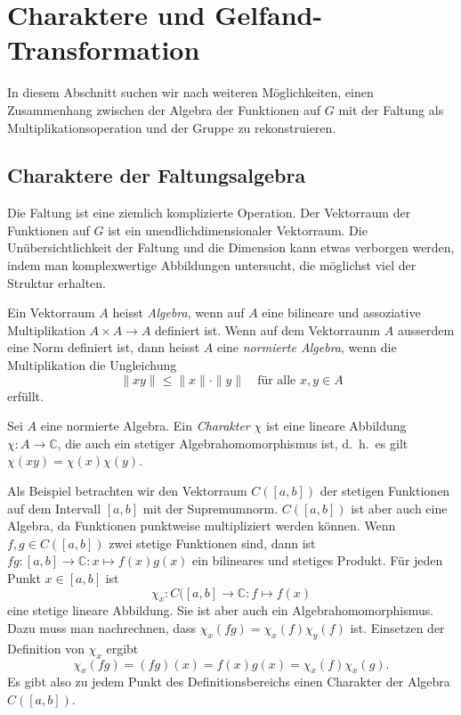 %
%
%
\section{Charaktere und Gelfand-Transformation
\label{buch:gruppen:section:gelfand}}
In diesem Abschnitt suchen wir nach weiteren Möglichkeiten, einen
Zusammenhang zwischen der Algebra der Funktionen auf $G$ mit der Faltung
als Multiplikationsoperation und der Gruppe zu rekonstruieren.

%
%
\subsection{Charaktere der Faltungsalgebra}
Die Faltung ist eine ziemlich komplizierte Operation.
Der Vektorraum der Funktionen auf $G$ ist ein unendlichdimensionaler
Vektorraum.
Die Unübersichtlichkeit der Faltung und die Dimension kann etwas
verborgen werden, indem man komplexwertige Abbildungen untersucht,
die möglichst viel der Struktur erhalten.

\begin{definition}[Algebra]
Ein Vektorraum $A$ heisst {\em Algebra}, wenn auf $A$ eine bilineare
%
und assoziative Multiplikation $A\times A\to A$ definiert ist.
Wenn auf dem Vektorraunm $A$ ausserdem eine Norm definiert ist, dann
heisst $A$ eine {\em normierte Algebra}, wenn die Multiplikation die
%
%
Ungleichung
\[
\| xy \| \le \|x\|\cdot \|y\|\quad\text{für alle $x,y\in A$}
\]
erfüllt.
\end{definition}

\begin{definition}[Charakter]
Sei $A$ eine normierte Algebra.
Ein {\em Charakter} $\chi$ ist eine lineare Abbildung
$\chi\colon A\to\mathbb{C}$,
%
die auch ein stetiger Algebrahomomorphismus ist, d.~h.~es gilt
$\chi(xy)=\chi(x)\chi(y)$.
\end{definition}

Als Beispiel betrachten wir den Vektorraum $C([a,b])$ der stetigen Funktionen
auf dem Intervall $[a,b]$ mit der Supremumnorm.
$C([a,b])$ ist aber auch eine Algebra, da Funktionen punktweise
multipliziert werden können.
Wenn $f,g\in C([a,b])$ zwei stetige Funktionen sind, dann ist
$fg\colon [a,b]\to\mathbb{C}:x\mapsto f(x)g(x)$ ein bilineares und
stetiges Produkt.
Für jeden Punkt $x\in[a,b]$ ist
\[
\chi_x
\colon
C([a,b] \to \mathbb{C}
:
f\mapsto f(x)
\]
eine stetige lineare Abbildung.
Sie ist aber auch ein Algebrahomomorphismus.
Dazu muss man nachrechnen, dass $\chi_x(fg)=\chi_x(f)\chi_y(f)$ ist.
Einsetzen der Definition von $\chi_x$ ergibt
\[
\chi_x(fg)
=
(fg)(x)
=
f(x)g(x)
=
\chi_x(f)\chi_x(g).
\]
Es gibt also zu jedem Punkt des Definitionsbereichs einen Charakter
der Algebra $C([a,b])$.

